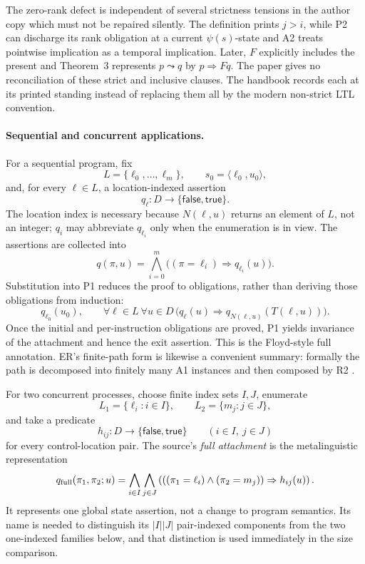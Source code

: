 The zero-rank defect is independent of several strictness tensions in the
author copy which must not be repaired silently.  The definition prints
\(j>i\), while P2 can discharge
its rank obligation at a current \(\psi(s)\)-state and A2 treats pointwise
implication as a temporal implication.  Later, \(F\) explicitly includes the
present and Theorem~3 represents \(p\leadsto q\) by \(p\Rightarrow Fq\).
The paper gives no reconciliation of these strict and inclusive clauses.  The
handbook records each at its printed standing instead of replacing them all by
the modern non-strict LTL convention.

\paragraph{Sequential and concurrent applications.}
For a sequential program, fix
\[
 L=\{\ell_0,\ldots,\ell_m\},
 \qquad s_0=\langle\ell_0,u_0\rangle,
\]
and, for every \(\ell\in L\), a location-indexed assertion
\[
 q_\ell:D\longrightarrow
   \{\mathsf{false},\mathsf{true}\}.
\]
The location index is necessary because \(N(\ell,u)\) returns an element of
\(L\), not an integer; \(q_i\) may abbreviate \(q_{\ell_i}\) only when the
enumeration is in view.  The assertions are collected into
\[
 q(\pi,u)=
 \bigwedge_{i=0}^{m}
  \bigl((\pi=\ell_i)\Rightarrow q_{\ell_i}(u)\bigr).
\]
Substitution into P1 reduces the proof to obligations, rather than deriving
those obligations from induction:
\[
 q_{\ell_0}(u_0),
 \qquad
 \forall\ell\in L\ \forall u\in D\,
 \bigl(q_\ell(u)\Rightarrow
       q_{N(\ell,u)}(T(\ell,u))\bigr).
\]
Once the initial and per-instruction obligations are proved, P1 yields
invariance of the attachment and hence the exit assertion.  This is the
Floyd-style full annotation.  ER's finite-path form is likewise a convenient
summary: formally the path is decomposed into finitely many A1 instances and
then composed by R2
\cite[p.~50]{Pnueli1977}.

For two concurrent processes, choose finite index sets \(I,J\), enumerate
\[
 L_1=\{\ell_i:i\in I\},
 \qquad L_2=\{m_j:j\in J\},
\]
 and take a predicate
\[
 h_{ij}:D\to\{\mathsf{false},\mathsf{true}\}
 \qquad(i\in I,\ j\in J)
\]
for every control-location pair.  The source's \emph{full attachment} is the
metalinguistic representation
\[
 q_{\rm full}(\pi_1,\pi_2;u)
 =\bigwedge_{i\in I}\bigwedge_{j\in J}
 \left(
   ((\pi_1=\ell_i)\land(\pi_2=m_j))\Rightarrow h_{ij}(u)
 \right).
\]
It represents one global state assertion, not a change to program semantics.
Its name is needed to distinguish its \(|I||J|\) pair-indexed components from
the two one-indexed families below, and that distinction is used immediately
in the size comparison.

